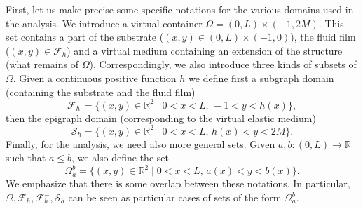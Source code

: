 \documentclass[JEP,XML,SOM,Unicode,NoFloatCountersInSection]{cedram}
\let\mathcal\mathscr
\theoremstyle{remark}
\theoremstyle{definition}
\newcommand{\Real}{\mathbb{R}}
\let\CM\Omega
\begin{document}
First, let us make precise some specific notations for the various domains used in the analysis. We introduce a virtual container $\Omega = (0,L) \times (-1,2M)$. This set contains a part of the substrate ($(x,y) \in (0,L) \times (-1,0)$), the fluid film
($(x,y) \in \mathcal F_h$) and a virtual medium containing an extension of the structure (what remains of $\Omega$).
Correspondingly, we also introduce three kinds of subsets of $\Omega$. Given a continuous positive function $h$ we define first a subgraph domain (containing the substrate and the fluid film)
\[\mathcal{F}^-_{h}=\{(x,y)\in\Real^{2}\mid 0<x<L,\,-1<y<h(x)\},\]
then the epigraph domain (corresponding to the virtual elastic medium)
\[\mathcal{S}_{h}=\{(x,y)\in\Real^{2}\mid 0<x<L,\,h(x)<y<2M\}.\]
Finally, for the analysis, we need also more general sets. Given $a,b:(0,L)\to \Real$ such that $a \leq b$,
we also define the set
\[\Omega_{a}^{b}=\{(x,y)\in\Real^{2}\mid 0<x<L,\,a(x)<y<b(x)\}.\]
We emphasize that there is some overlap between these notations.
In particular, $\CM, \mathcal{F}_{h}, \mathcal{F}^-_{h}, \mathcal{S}_{h}$ can be seen as particular cases of sets of the form $\Omega_{a}^{b}$.
\end{document}
